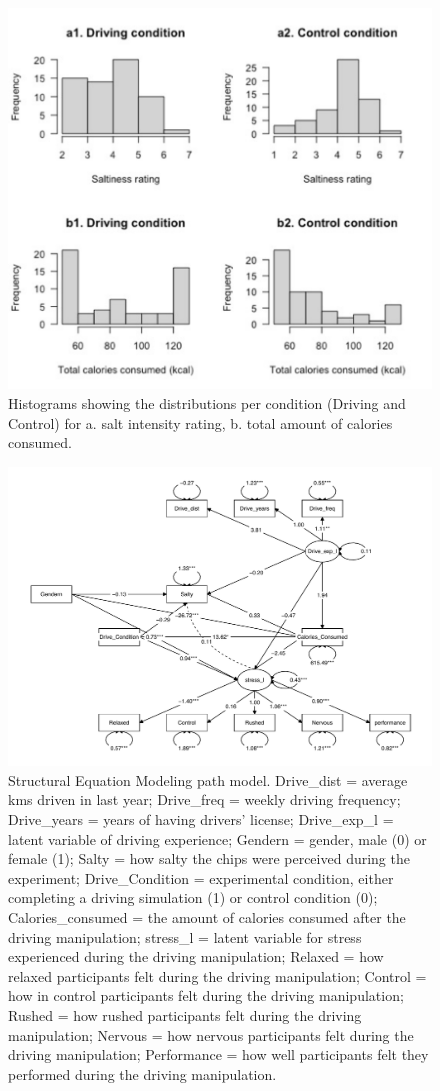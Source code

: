 \documentclass[authordate, empirical, issue]{jote-new-article}
\begin{document}
\begin{figure}
  \centering
  \includegraphics[width=.7\textwidth]{media/image5.pdf}
  \caption{Histograms showing the distributions per condition (Driving and Control) for a. salt intensity rating, b. total amount of calories consumed.}

  \label{fig:rId27}

\end{figure}


\begin{figure}

  \includegraphics[width=\textwidth]{media/image6.pdf}
  \caption{Structural Equation Modeling path model. Drive\_dist = average kms driven in last year; Drive\_freq = weekly driving frequency; Drive\_years = years of having drivers’ license; Drive\_exp\_l = latent variable of driving experience; Gendern = gender, male (0) or female (1); Salty = how salty the chips were perceived during the experiment; Drive\_Condition = experimental condition, either completing a driving simulation (1) or control condition (0); Calories\_consumed = the amount of calories consumed after the driving manipulation; stress\_l = latent variable for stress experienced during the driving manipulation; Relaxed = how relaxed participants felt during the driving manipulation; Control = how in control participants felt during the driving manipulation; Rushed = how rushed participants felt during the driving manipulation; Nervous = how nervous participants felt during the driving manipulation; Performance = how well participants felt they performed during the driving manipulation.}
  \label{fig:rId28}
\end{figure}
\end{document}
